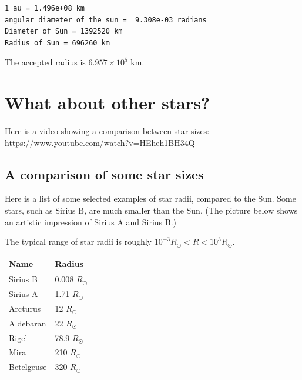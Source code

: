 \documentclass[
  letterpaper,
  DIV=11,
  numbers=noendperiod]{scrreprt}
\begin{document}
\begin{verbatim}
1 au = 1.496e+08 km
angular diameter of the sun =  9.308e-03 radians
Diameter of Sun = 1392520 km
Radius of Sun = 696260 km
\end{verbatim}

The accepted radius is \(6.957\times 10^5\) km.

\hypertarget{what-about-other-stars}{%
\section{What about other stars?}\label{what-about-other-stars}}

Here is a video showing a comparison between star sizes:
https://www.youtube.com/watch?v=HEheh1BH34Q

\hypertarget{a-comparison-of-some-star-sizes}{%
\subsection{A comparison of some star
sizes}\label{a-comparison-of-some-star-sizes}}

Here is a list of some selected examples of star radii, compared to the
Sun. Some stars, such as Sirius B, are much smaller than the Sun. (The
picture below shows an artistic impression of Sirius A and Sirius B.)

The typical range of star radii is roughly
\(10^{-3}R_\odot < R < 10^3 R_\odot\).

\begin{longtable}[]{@{}ll@{}}
\toprule\noalign{}
Name & Radius \\
\midrule\noalign{}
\endhead
\bottomrule\noalign{}
\endlastfoot
Sirius B & 0.008 \(R_\odot\) \\
Sirius A & 1.71 \(R_\odot\) \\
Arcturus & 12 \(R_\odot\) \\
Aldebaran & 22 \(R_\odot\) \\
Rigel & 78.9 \(R_\odot\) \\
Mira & 210 \(R_\odot\) \\
Betelgeuse & 320 \(R_\odot\) \\
\end{longtable}
\end{document}
